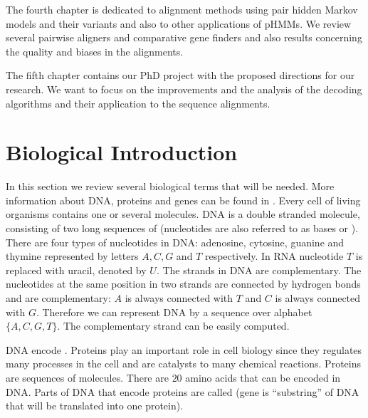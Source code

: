 The fourth chapter is dedicated to alignment methods  using pair hidden Markov
models and their variants and also to other applications of pHMMs. We review
several pairwise aligners and comparative gene finders and also results
concerning the quality and biases in the alignments.

The fifth chapter contains our PhD project with the proposed directions for our
research. We want to focus on the improvements and the analysis of the decoding
algorithms and their application to the sequence alignments. 

\section{Biological Introduction}



In this section we review several biological terms that will be needed. More
information about DNA, proteins and genes can be found in
\cite{BiologyForDummies,UnderstandingBioinformatics}.  Every cell of living
organisms contains one or several  molecules. DNA is a double
stranded molecule, consisting of two long sequences of 
(nucleotides are also referred to as bases or ). There are
four types of nucleotides in DNA: adenosine, cytosine, guanine and thymine
represented by letters $A,C,G$ and $T$ respectively. In RNA nucleotide $T$ is
replaced with uracil, denoted by $U$. The strands in DNA are complementary. The
nucleotides at the same position in two strands are connected by hydrogen bonds
and are complementary: $A$ is always connected with $T$ and $C$ is always
connected with $G$. Therefore we can represent DNA by a sequence over alphabet
$\{A,C,G,T\}$. The complementary strand can be easily computed.

DNA encode . Proteins play an important role in cell
biology since  they regulates many processes in the cell and are catalysts to
many chemical reactions. Proteins are sequences of 
molecules. There are $20$ amino acids that can be encoded in DNA. Parts of DNA
that encode proteins are called  (gene is ``substring'' of DNA
that will be translated into one protein).

